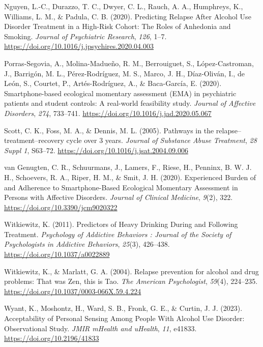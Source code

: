 \documentclass[
  letterpaper,
  DIV=11,
  numbers=noendperiod]{scrartcl}
\newlength{\cslhangindent}
\newenvironment{CSLReferences}[2] %
 {\begin{list}{}{%
  \setlength{\itemindent}{0pt}
  \setlength{\leftmargin}{0pt}
  \setlength{\parsep}{0pt}
  \ifodd #1
   \setlength{\leftmargin}{\cslhangindent}
   \setlength{\itemindent}{-1\cslhangindent}
  \fi
  \setlength{\itemsep}{#2\baselineskip}}}
 {\end{list}}
\begin{document}
\begin{CSLReferences}{1}{0}
Nguyen, L.-C., Durazzo, T. C., Dwyer, C. L., Rauch, A. A., Humphreys,
K., Williams, L. M., \& Padula, C. B. (2020). Predicting {Relapse After
Alcohol Use Disorder Treatment} in a {High-Risk Cohort}: {The Roles} of
{Anhedonia} and {Smoking}. \emph{Journal of Psychiatric Research},
\emph{126}, 1--7. \url{https://doi.org/10.1016/j.jpsychires.2020.04.003}

Porras-Segovia, A., Molina-Madueño, R. M., Berrouiguet, S.,
López-Castroman, J., Barrigón, M. L., Pérez-Rodríguez, M. S., Marco, J.
H., Díaz-Oliván, I., de León, S., Courtet, P., Artés-Rodríguez, A., \&
Baca-García, E. (2020). Smartphone-based ecological momentary assessment
({EMA}) in psychiatric patients and student controls: {A} real-world
feasibility study. \emph{Journal of Affective Disorders}, \emph{274},
733--741. \url{https://doi.org/10.1016/j.jad.2020.05.067}

Scott, C. K., Foss, M. A., \& Dennis, M. L. (2005). Pathways in the
relapse--treatment--recovery cycle over 3 years. \emph{Journal of
Substance Abuse Treatment}, \emph{28 Suppl 1}, S63--72.
\url{https://doi.org/10.1016/j.jsat.2004.09.006}

van Genugten, C. R., Schuurmans, J., Lamers, F., Riese, H., Penninx, B.
W. J. H., Schoevers, R. A., Riper, H. M., \& Smit, J. H. (2020).
Experienced {Burden} of and {Adherence} to {Smartphone-Based Ecological
Momentary Assessment} in {Persons} with {Affective Disorders}.
\emph{Journal of Clinical Medicine}, \emph{9}(2), 322.
\url{https://doi.org/10.3390/jcm9020322}

Witkiewitz, K. (2011). Predictors of {Heavy Drinking During} and
{Following Treatment}. \emph{Psychology of Addictive Behaviors : Journal
of the Society of Psychologists in Addictive Behaviors}, \emph{25}(3),
426--438. \url{https://doi.org/10.1037/a0022889}

Witkiewitz, K., \& Marlatt, G. A. (2004). Relapse prevention for alcohol
and drug problems: That was {Zen}, this is {Tao}. \emph{The American
Psychologist}, \emph{59}(4), 224--235.
\url{https://doi.org/10.1037/0003-066X.59.4.224}

Wyant, K., Moshontz, H., Ward, S. B., Fronk, G. E., \& Curtin, J. J.
(2023). Acceptability of {Personal Sensing Among People With Alcohol Use
Disorder}: {Observational Study}. \emph{JMIR mHealth and uHealth},
\emph{11}, e41833. \url{https://doi.org/10.2196/41833}


\end{CSLReferences}
\end{document}
